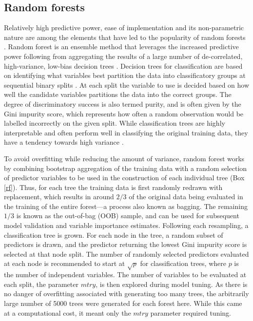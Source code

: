 \documentclass[12pt, a4paper]{article}
\begin{document}
\subsection{Random forests}
Relatively high predictive power, ease of implementation and its non-parametric nature are among the elements that have led to the popularity of random forests \citep[][587--604]{hastie2009}. Random forest is an ensemble method that leverages the increased predictive power following from aggregating the results of a large number of de-correlated, high-variance, low-bias decision trees \citep{breiman2001b}. Decision trees for classification are based on identifying what variables best partition the data into classificatory groups at sequential binary splits \citep[][116--118]{baxter2003}. At each split the variable to use is decided based on how well the candidate variables partitions the data into the correct groups. The degree of discriminatory success is also termed purity, and is often given by the Gini impurity score, which represents how often a random observation would be labelled incorrectly on the given split. While classification trees are highly interpretable and often perform well in classifying the original training data, they have a tendency towards high variance \citep[][312]{hastie2009}. \par
To avoid overfitting while reducing the amount of variance, random forest works by combining bootstrap aggregation of the training data with a random selection of predictor variables to be used in the construction of each individual tree (Box \ref{rf}). Thus, for each tree the training data is first randomly redrawn with replacement, which results in around $2/3$ of the original data being evaluated in the training of the entire forest---a process also known as bagging. The remaining $1/3$ is known as the out-of-bag (OOB) sample, and can be used for subsequent model validation and variable importance estimates. Following each resampling, a classification tree is grown. For each node in the tree, a random subset of predictors is drawn, and the predictor returning the lowest Gini impurity score is selected at that node split. The number of randomly selected predictors evaluated at each node is recommended to start at $\sqrt{p}$ for classification trees, where $p$ is the number of independent variables. The number of variables to be evaluated at each split, the parameter $mtry$, is then explored during model tuning. As there is no danger of overfitting associated with generating too many trees, the arbitrarily large number of 5000 trees were generated for each forest here. While this came at a computational cost, it meant only the $mtry$ parameter required tuning. \\
\end{document}
